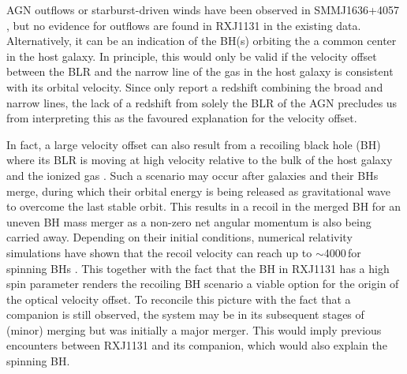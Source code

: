 \documentclass[]{emulateapj}
\begin{document}
AGN outflows or starburst-driven winds have been observed
in \eg SMMJ1636+4057 \citep[][]{Swinbank05a}, but 
no evidence for outflows are found in RXJ1131 in the existing data. 
Alternatively, it can be an indication of the BH(s) orbiting the a common center in
the host galaxy.
In principle, this would only be valid if the velocity offset between the BLR and 
the narrow line of the gas in the host galaxy is consistent with its orbital velocity. 
Since  only report a redshift combining the broad and narrow lines, 
the lack of a redshift from solely the BLR of the AGN precludes us from interpreting this as the favoured
explanation for the velocity offset.

In fact, a large velocity offset can also result from a recoiling black hole (BH) where its
BLR is moving at high velocity relative to the bulk of the host galaxy and
the ionized gas \citep{Madau04a, Bonning07a, Loeb07a}. %
Such a scenario may occur after galaxies and their BHs merge, during which 
their orbital energy is being released as gravitational wave to overcome the last stable orbit.
This results in a recoil in the merged BH for an uneven BH mass merger as a
non-zero net angular momentum is also being carried away.
Depending on their initial conditions, %
numerical relativity simulations have shown that
the recoil velocity can reach up to $\sim$4000\,\kms for spinning BHs \citep[\eg][]{Campanelli07a}.
This together with the fact that the BH in RXJ1131 has a high spin parameter \citep{Reis14a} 
renders the recoiling BH scenario a viable option for the origin
of the optical velocity offset.
To reconcile this picture with the fact that a companion is still observed, 
the system may be in its subsequent stages of (minor) merging but was initially
a major merger. 
This would imply previous encounters between RXJ1131 and its companion, 
which would also explain the spinning BH.
\end{document}
